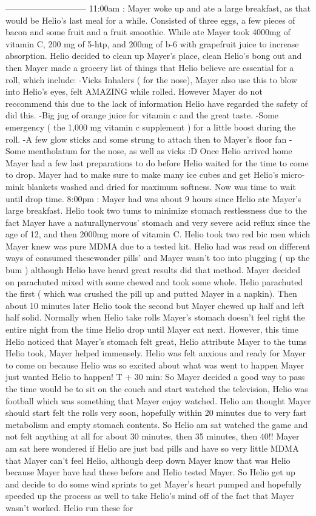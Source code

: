 \documentclass[12pt]{book}
\begin{document}
----------------------------- 11:00am : Mayer woke up and ate a large breakfast, as that would be Helio's last meal for a while. Consisted of three eggs, a few pieces of bacon and some fruit and a fruit smoothie. While ate Mayer took 4000mg of vitamin C, 200 mg of 5-htp, and 200mg of b-6 with grapefruit juice to increase absorption. Helio decided to clean up Mayer's place, clean Helio's bong out and then Mayer made a grocery list of things that Helio believe are essential for a roll, which include: -Vicks Inhalers ( for the nose), Mayer also use this to blow into Helio's eyes, felt AMAZING while rolled. However Mayer do not reccommend this due to the lack of information Helio have regarded the safety of did this. -Big jug of orange juice for vitamin c and the great taste. -Some emergency ( the 1,000 mg vitamin c supplement ) for a little boost during the roll. -A few glow sticks and some strung to attach then to Mayer's floor fan -Some mentholatum for the nose, as well as vicks :D Once Helio arrived home Mayer had a few last preparations to do before Helio waited for the time to come to drop. Mayer had to make sure to make many ice cubes and get Helio's micro-mink blankets washed and dried for maximum softness. Now was time to wait until drop time. 8:00pm : Mayer had was about 9 hours since Helio ate Mayer's large breakfast. Helio took two tums to minimize stomach restlessness due to the fact Mayer have a naturallynervous' stomach and very severe acid reflux since the age of 12, and then 2000mg more of vitamin C. Helio took two red bic men which Mayer knew was pure MDMA due to a tested kit. Helio had was read on different ways of consumed thesewonder pills' and Mayer wasn't too into plugging ( up the bum ) although Helio have heard great results did that method. Mayer decided on parachuted mixed with some chewed and took some whole. Helio parachuted the first ( which was crushed the pill up and putted Mayer in a napkin). Then about 10 minutes later Helio took the second but Mayer chewed up half and left half solid. Normally when Helio take rolls Mayer's stomach doesn't feel right the entire night from the time Helio drop until Mayer eat next. However, this time Helio noticed that Mayer's stomach felt great, Helio attribute Mayer to the tums Helio took, Mayer helped immensely. Helio was felt anxious and ready for Mayer to come on because Helio was so excited about what was went to happen Mayer just wanted Helio to happen! T + 30 min: So Mayer decided a good way to pass the time would be to sit on the couch and start watched the television, Helio was football which was something that Mayer enjoy watched. Helio am thought Mayer should start felt the rolls very soon, hopefully within 20 minutes due to very fast metabolism and empty stomach contents. So Helio am sat watched the game and not felt anything at all for about 30 minutes, then 35 minutes, then 40!! Mayer am sat here wondered if Helio are just bad pills and have so very little MDMA that Mayer can't feel Helio, although deep down Mayer know that was Helio because Mayer have had these before and Helio tested Mayer. So Helio get up and decide to do some wind sprints to get Mayer's heart pumped and hopefully speeded up the process as well to take Helio's mind off of the fact that Mayer wasn't worked. Helio run these for 
\end{document}
